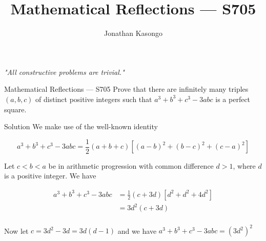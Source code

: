 \documentclass{article}
\author{Jonathan Kasongo}
\title{Mathematical Reflections --- S705}
\begin{document}
\maketitle

\textit{"All constructive problems are trivial."}

\begin{problem}{Mathematical Reflections --- S705}
Prove that there are infinitely many triples $(a,b,c)$ of distinct positive
integers such that $a^3 + b^3 + c^3 - 3abc$ is a perfect square.
\end{problem}

\begin{solution}{Solution}
We make use of the well-known identity

$$
a^3 + b^3 + c^3 - 3abc = \frac{1}{2}(a + b + c)\left[ (a-b)^2 +
(b-c)^2 + (c-a)^2 \right]
$$

Let $c < b < a$ be in arithmetic progression with common difference
$d > 1$, where $d$ is a positive integer. We have

\[
\begin{aligned}
a^3 + b^3 + c^3 - 3abc &= \frac{1}{2} (c + 3d) \left[ d^2 + d^2 + 4d^2 \right]\\
&= 3d^2 (c + 3d) \\
\end{aligned}
\]

Now let $c = 3d^2 - 3d = 3d(d - 1)$ and we have $a^3 + b^3 + c^3 - 3abc =
\left(3d^2\right)^2$
\end{solution}
\end{document}
